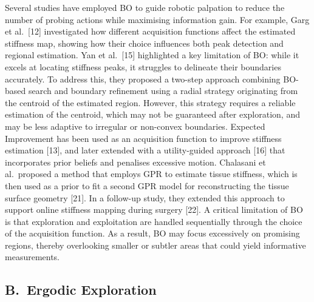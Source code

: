 \documentclass[11pt]{article}
\begin{document}
Several studies have employed BO to guide robotic palpation to reduce
the number of probing actions while maximising information gain. For
example, Garg et al.\ [12] investigated how different acquisition
functions affect the estimated stiffness map, showing how their
choice influences both peak detection and regional estimation. Yan
et al.\ [15] highlighted a key limitation of BO: while it excels at
locating stiffness peaks, it struggles to delineate their boundaries
accurately. To address this, they proposed a two-step approach
combining BO-based search and boundary refinement using a radial
strategy originating from the centroid of the estimated region.
However, this strategy requires a reliable estimation of the
centroid, which may not be guaranteed after exploration, and may be
less adaptive to irregular or non-convex boundaries. Expected
Improvement has been used as an acquisition function to improve
stiffness estimation [13], and later extended with a utility-guided
approach [16] that incorporates prior beliefs and penalises excessive
motion. Chalasani et al.\ proposed a method that employs GPR to
estimate tissue stiffness, which is then used as a prior to fit a
second GPR model for reconstructing the tissue surface geometry [21].
In a follow-up study, they extended this approach to support online
stiffness mapping during surgery [22]. A critical limitation of BO
is that exploration and exploitation are handled sequentially through
the choice of the acquisition function. As a result, BO may focus
excessively on promising regions, thereby overlooking smaller or
subtler areas that could yield informative measurements.

\subsection*{B.\ Ergodic Exploration}
\end{document}
